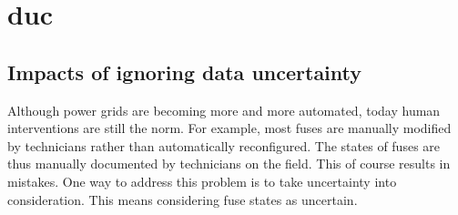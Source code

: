 \section[Data uncertainty]{\gls{duc}}
\label{sec:example:duc}

\subsection{Impacts of ignoring data uncertainty} 
\label{subsec:example-possible-consequences}
%
%

Although power grids are becoming more and more automated, today human interventions are still the norm.
For example, most fuses are manually modified by technicians rather than automatically reconfigured.
The states of fuses are thus manually documented by technicians on the field. 
This of course results in mistakes. 
One way to address this problem is to take uncertainty into consideration.
This means considering fuse states as uncertain.

